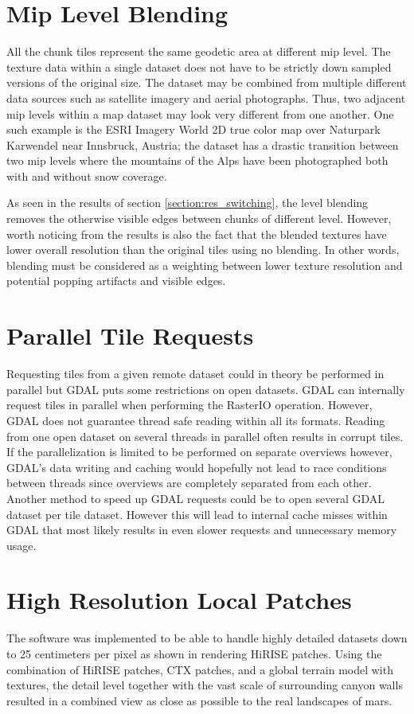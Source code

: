 \section{Mip Level Blending}
All the chunk tiles represent the same geodetic area at different mip level. 
The texture data within a single dataset does not have to be strictly down sampled versions of the original size. 
The dataset may be combined from multiple different data sources such as satellite imagery and aerial photographs. 
Thus, two adjacent mip levels within a map dataset may look very different from one another. 
One such example is the ESRI Imagery World 2D true color map over Naturpark Karwendel near Innsbruck, Austria; the dataset has a drastic transition between two mip levels where the mountains of the Alps have been photographed both with and without snow coverage.

As seen in the results of section \ref{section:res_switching}, the level blending removes the otherwise visible edges between chunks of different level. However, worth noticing from the results is also the fact that the blended textures have lower overall resolution than the original tiles using no blending. In other words, blending must be considered as a weighting between lower texture resolution and potential popping artifacts and visible edges. 

\section{Parallel Tile Requests}
Requesting tiles from a given remote dataset could in theory be performed in parallel but GDAL puts some restrictions on open datasets. GDAL can internally request tiles in parallel when performing the RasterIO operation. However, GDAL does not guarantee thread safe reading within all its formats. Reading from one open dataset on several threads in parallel often results in corrupt tiles. If the parallelization is limited to be performed on separate overviews however, GDAL's data writing and caching would hopefully not lead to race conditions between threads since overviews are completely separated from each other. Another method to speed up GDAL requests could be to open several GDAL dataset per tile dataset. However this will lead to internal cache misses within GDAL that most likely results in even slower requests and unnecessary memory usage.

\section{High Resolution Local Patches}
The software was implemented to be able to handle highly detailed datasets down to 25 centimeters per pixel as shown in  rendering HiRISE patches. Using the combination of HiRISE patches, CTX patches, and a global terrain model with textures, the detail level together with the vast scale of surrounding canyon walls resulted in a combined view as close as possible to the real landscapes of mars.

